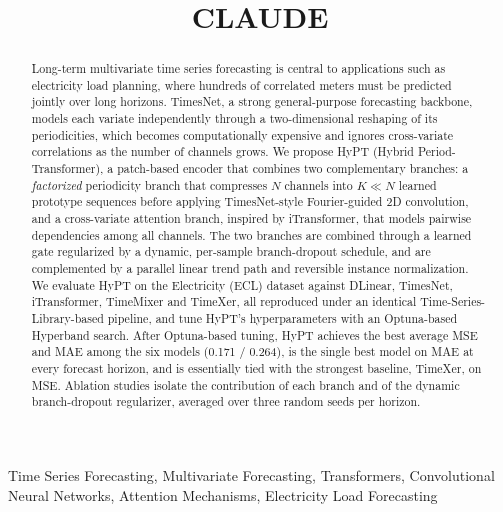 \documentclass[10pt,journal]{IEEEtran}
\begin{document}
\title{CLAUDE}

\author{
}

\maketitle

\begin{abstract}
Long-term multivariate time series forecasting is central to applications such as electricity load planning, where hundreds of correlated meters must be predicted jointly over long horizons. TimesNet, a strong general-purpose forecasting backbone, models each variate independently through a two-dimensional reshaping of its periodicities, which becomes computationally expensive and ignores cross-variate correlations as the number of channels grows. We propose HyPT (Hybrid Period-Transformer), a patch-based encoder that combines two complementary branches: a \emph{factorized} periodicity branch that compresses $N$ channels into $K \! \ll \! N$ learned prototype sequences before applying TimesNet-style Fourier-guided 2D convolution, and a cross-variate attention branch, inspired by iTransformer, that models pairwise dependencies among all channels. The two branches are combined through a learned gate regularized by a dynamic, per-sample branch-dropout schedule, and are complemented by a parallel linear trend path and reversible instance normalization. We evaluate HyPT on the Electricity (ECL) dataset against DLinear, TimesNet, iTransformer, TimeMixer and TimeXer, all reproduced under an identical Time-Series-Library-based pipeline, and tune HyPT's hyperparameters with an Optuna-based Hyperband search. After Optuna-based tuning, HyPT achieves the best average MSE and MAE among the six models (0.171 / 0.264), is the single best model on MAE at every forecast horizon, and is essentially tied with the strongest baseline, TimeXer, on MSE. Ablation studies isolate the contribution of each branch and of the dynamic branch-dropout regularizer, averaged over three random seeds per horizon.
\end{abstract}

\begin{IEEEkeywords}
Time Series Forecasting, Multivariate Forecasting, Transformers, Convolutional Neural Networks, Attention Mechanisms, Electricity Load Forecasting
\end{IEEEkeywords}
\end{document}
